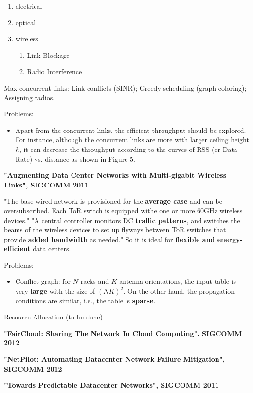 \documentclass[journal,onecolumn,11pt]{IEEEtran}
\begin{document}
\begin{enumerate}
  \item electrical
  \item optical
  \item wireless
  \begin{enumerate}
    \item Link Blockage
    \item Radio Interference
  \end{enumerate}
\end{enumerate}

Max concurrent links: Link conflicts (SINR); Greedy scheduling (graph coloring); Assigning radios.

Problems:
\begin{itemize}
  \item Apart from the concurrent links, the efficient throughput should be explored. For instance, although the concurrent links are more with larger ceiling height $h$, it can decrease the throughput according to the curves of RSS (or Data Rate) vs. distance as shown in Figure 5.
\end{itemize}


\textbf{"Augmenting Data Center Networks with Multi-gigabit Wireless Links", SIGCOMM 2011}

"The base wired network is provisioned for the \textbf{average case} and can be oversubscribed. Each ToR switch is equipped withe one or more 60GHz wireless devices." "A central controller monitors DC \textbf{traffic patterns}, and switches the beams of the wireless devices to set up flyways between ToR switches that provide \textbf{added bandwidth} as needed." So it is ideal for \textbf{flexible and energy-efficient} data centers.

Problems:
\begin{itemize}
  \item Conflict graph: for $N$ racks and $K$ antenna orientations, the input table is very \textbf{large} with the size of $(NK)^2$. On the other hand, the propagation conditions are similar, i.e., the table is \textbf{sparse}.
\end{itemize}

Resource Allocation (to be done)

\textbf{"FairCloud: Sharing The Network In Cloud Computing", SIGCOMM 2012}

\textbf{"NetPilot: Automating Datacenter Network Failure Mitigation", SIGCOMM 2012}

\textbf{"Towards Predictable Datacenter Networks", SIGCOMM 2011}

\renewcommand\refname{References}
%


\end{document}
